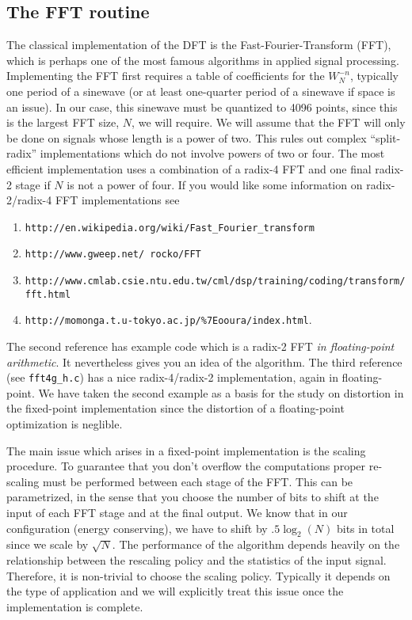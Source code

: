\documentclass[11pt]{article}
\begin{document}
\subsection{The FFT routine}
The classical implementation of the DFT is the Fast-Fourier-Transform (FFT), which is perhaps one of the most
famous algorithms in applied signal processing.  Implementing the FFT first requires a table of coefficients for the $W_N^{-n}$, 
typically one period of a sinewave (or at least one-quarter period of a sinewave if space is an issue).  In our case, 
this sinewave must be quantized to 4096 points, since this is the largest FFT size, $N$, we will require.  We will assume that 
the FFT will only be done on signals whose length is a power of two.  This rules out complex ``split-radix'' implementations 
which do not involve powers of two or four.  The most efficient implementation uses a combination of a radix-4 FFT and one final 
radix-2 stage if $N$ is not a power of four.  If you would like some information on radix-2/radix-4 FFT implementations 
see \par
\begin{small}
\begin{enumerate}
\item {\tt http://en.wikipedia.org/wiki/Fast\_Fourier\_transform}
\item {\tt http://www.gweep.net/~rocko/FFT} 
\item {\tt http://www.cmlab.csie.ntu.edu.tw/cml/dsp/training/coding/transform/fft.html}
\item {\tt http://momonga.t.u-tokyo.ac.jp/\%7Eooura/index.html}.  
\end{enumerate}
\end{small}


The second reference has example code which is a radix-2 FFT {\em in floating-point arithmetic}.  
It nevertheless gives you an idea of the algorithm.  The third reference (see {\tt fft4g\_h.c}) has a nice 
radix-4/radix-2 implementation, again in floating-point. We have taken the second example as a basis for the study on 
distortion in the fixed-point implementation since the distortion of a floating-point optimization is neglible.

The main issue which arises in a fixed-point implementation is the scaling procedure.  To guarantee that you don't overflow
the computations proper re-scaling must be performed between each stage of the FFT.  This can be parametrized, in the sense that you choose
the number of bits to shift at the input of each FFT stage and at the final output. We know that in our configuration (energy conserving),
we have to shift by $.5\log_2(N)$ bits in total since we scale by $\sqrt{N}$.    The performance
of the algorithm depends heavily on the relationship between the rescaling policy and the statistics of the input signal.  Therefore,
it is non-trivial to choose the scaling policy.  Typically it depends on the type of application and we will explicitly treat this issue 
once the implementation is complete.
\end{document}
